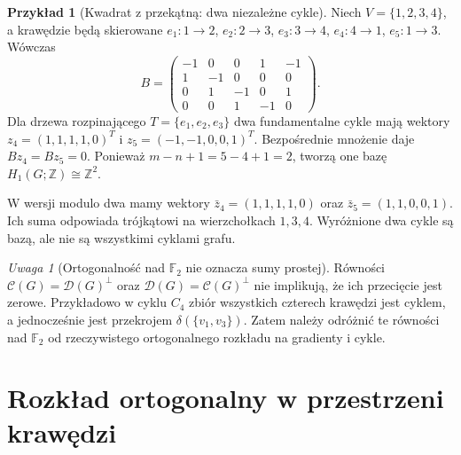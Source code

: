 \documentclass[11pt,a4paper]{report}
\numberwithin{equation}{section}
\theoremstyle{plain}
\theoremstyle{definition}
\newtheorem{przyklad}[twierdzenie]{Przykład}
\theoremstyle{remark}
\newtheorem{uwaga}[twierdzenie]{Uwaga}
\begin{document}
\begin{przyklad}[Kwadrat z przekątną: dwa niezależne cykle]
Niech $V=\{1,2,3,4\}$, a krawędzie będą skierowane
$e_1:1\to2$, $e_2:2\to3$, $e_3:3\to4$,
$e_4:4\to1$, $e_5:1\to3$. Wówczas
\[
B=\begin{pmatrix}
-1&0&0&1&-1\\1&-1&0&0&0\\
0&1&-1&0&1\\0&0&1&-1&0
\end{pmatrix}.
\]
Dla drzewa rozpinającego $T=\{e_1,e_2,e_3\}$
dwa fundamentalne cykle mają wektory
$z_4=(1,1,1,1,0)^T$ i $z_5=(-1,-1,0,0,1)^T$.
Bezpośrednie mnożenie daje $Bz_4=Bz_5=0$.
Ponieważ $m-n+1=5-4+1=2$, tworzą one bazę
$H_1(G;\mathbb Z)\cong\mathbb Z^2$.

W wersji modulo dwa mamy wektory
$\bar z_4=(1,1,1,1,0)$ oraz $\bar z_5=(1,1,0,0,1)$.
Ich suma odpowiada trójkątowi na wierzchołkach $1,3,4$.
Wyróżnione dwa cykle są bazą, ale nie są wszystkimi
cyklami grafu.
\end{przyklad}

\begin{center}
\end{center}

\begin{uwaga}[Ortogonalność nad $\mathbb F_2$ nie oznacza sumy prostej]
Równości $\mathcal C(G)=\mathcal D(G)^\perp$ oraz
$\mathcal D(G)=\mathcal C(G)^\perp$ nie implikują,
że ich przecięcie jest zerowe. Przykładowo w cyklu
$C_4$ zbiór wszystkich czterech krawędzi jest cyklem,
a jednocześnie jest przekrojem $\delta(\{v_1,v_3\})$.
Zatem należy odróżnić te równości nad $\mathbb F_2$
od rzeczywistego ortogonalnego rozkładu na gradienty i cykle.
\end{uwaga}

\section{Rozkład ortogonalny w przestrzeni krawędzi}
\label{sec:tg-linear-hodge}
\end{document}
